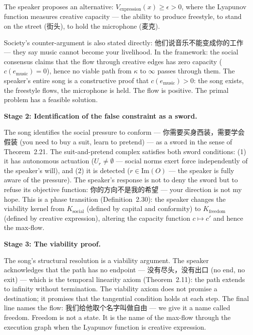 \documentclass[11pt,a4paper]{article}
\theoremstyle{definition}
\theoremstyle{remark}
\begin{document}
The speaker proposes an alternative: $V_{\text{expression}}(x) \geq \epsilon > 0$, where the Lyapunov function measures creative capacity --- the ability to produce freestyle, to stand on the street (街头), to hold the microphone (麦克).

Society's counter-argument is also stated directly: 他们说音乐不能变成你的工作 --- they say music cannot become your livelihood. In the framework: the social consensus claims that the flow through creative edges has zero capacity ($c(e_{\text{music}}) = 0$), hence no viable path from $\kappa$ to $\infty$ passes through them. The speaker's entire song is a constructive proof that $c(e_{\text{music}}) > 0$: the song exists, the freestyle flows, the microphone is held. The flow is positive. The primal problem has a feasible solution.

\textbf{Stage 2: Identification of the false constraint as a sword.}

The song identifies the social pressure to conform --- 你需要买身西装，需要学会假装 (you need to buy a suit, learn to pretend) --- as a sword in the sense of Theorem~2.21. The suit-and-pretend complex satisfies both sword conditions: (1) it has autonomous actuation ($U_r \neq \emptyset$ --- social norms exert force independently of the speaker's will), and (2) it is detected ($r \in \text{Im}(O)$ --- the speaker is fully aware of the pressure). The speaker's response is not to deny the sword but to refuse its objective function: 你的方向不是我的希望 --- your direction is not my hope. This is a phase transition (Definition~2.30): the speaker changes the viability kernel from $K_{\text{social}}$ (defined by capital and conformity) to $K_{\text{freedom}}$ (defined by creative expression), altering the capacity function $c \mapsto c'$ and hence the max-flow.

\textbf{Stage 3: The viability proof.}

The song's structural resolution is a viability argument. The speaker acknowledges that the path has no endpoint --- 没有尽头，没有出口 (no end, no exit) --- which is the temporal linearity axiom (Theorem~2.11): the path extends to infinity without termination. The viability axiom does not promise a destination; it promises that the tangential condition holds at each step. The final line names the flow: 我们给他取个名字叫做自由 --- we give it a name called freedom. Freedom is not a state. It is the name of the max-flow through the execution graph when the Lyapunov function is creative expression.
\end{document}
